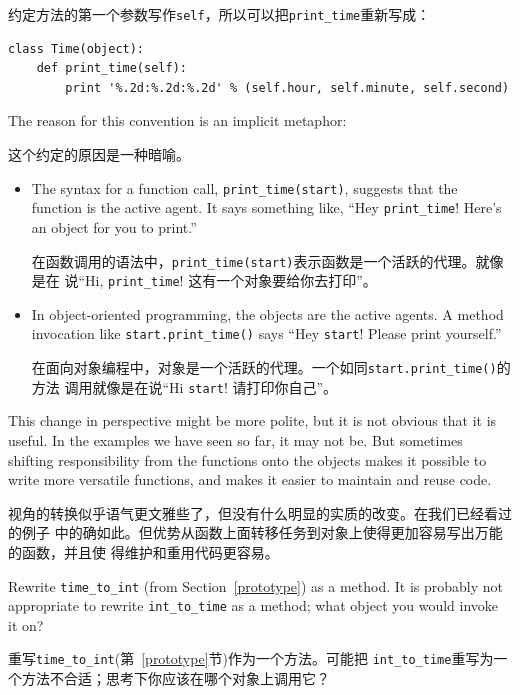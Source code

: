 \documentclass[10pt]{book}
\begin{document}
\begin{CJK}{UTF8}{gbsn}
约定方法的第一个参数写作{\tt self}，所以可以把\verb"print_time"重新写成：

\begin{verbatim}
class Time(object):
    def print_time(self):
        print '%.2d:%.2d:%.2d' % (self.hour, self.minute, self.second)
\end{verbatim}
%
The reason for this convention is an implicit metaphor:

这个约定的原因是一种暗喻。

\begin{itemize}

\item The syntax for a function call, \verb"print_time(start)",
  suggests that the function is the active agent.  It says something
  like, ``Hey \verb"print_time"!  Here's an object for you to print.''

在函数调用的语法中，\verb"print_time(start)"表示函数是一个活跃的代理。就像是在
说``Hi, \verb"print_time"! 这有一个对象要给你去打印''。

\item In object-oriented programming, the objects are the active
  agents.  A method invocation like \verb"start.print_time()" says
  ``Hey {\tt start}!  Please print yourself.''

在面向对象编程中，对象是一个活跃的代理。一个如同\verb"start.print_time()"的方法
调用就像是在说``Hi {\tt start}! 请打印你自己''。

\end{itemize}

This change in perspective might be more polite, but it is not obvious
that it is useful.  In the examples we have seen so far, it may not
be.  But sometimes shifting responsibility from the functions onto the
objects makes it possible to write more versatile functions, and makes
it easier to maintain and reuse code.

视角的转换似乎语气更文雅些了，但没有什么明显的实质的改变。在我们已经看过的例子
中的确如此。但优势从函数上面转移任务到对象上使得更加容易写出万能的函数，并且使
得维护和重用代码更容易。

\begin{exercise}
\label{convert}

Rewrite \verb"time_to_int" (from Section~\ref{prototype}) as a method.
It is probably not appropriate to rewrite \verb"int_to_time" as a
method; what object you would invoke it on?

重写\verb"time_to_int"(第~\ref{prototype}节)作为一个方法。可能把
\verb"int_to_time"重写为一个方法不合适；思考下你应该在哪个对象上调用它？


\end{exercise}
\end{CJK}
\end{document}
